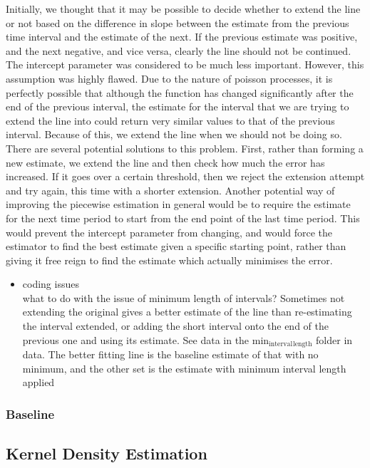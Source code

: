 \documentclass[a4paper,11pt]{article}
\begin{document}
    Initially, we thought that it may be possible to decide whether to
    extend the line or not based on the difference in slope between
    the estimate from the previous time interval and the estimate of
    the next. If the previous estimate was positive, and the next
    negative, and vice versa, clearly the line should not be
    continued. The intercept parameter was considered to be much less
    important. However, this assumption was highly flawed. Due to the
    nature of poisson processes, it is perfectly possible that
    although the function has changed significantly after the end of
    the previous interval, the estimate for the interval that we are
    trying to extend the line into could return very similar values to
    that of the previous interval. Because of this, we extend the line
    when we should not be doing so. There are several potential
    solutions to this problem. First, rather than forming a new
    estimate, we extend the line and then check how much the error has
    increased. If it goes over a certain threshold, then we reject the
    extension attempt and try again, this time with a shorter
    extension. Another potential way of improving the piecewise
    estimation in general would be to require the estimate for the
    next time period to start from the end point of the last time
    period. This would prevent the intercept parameter from changing,
    and would force the estimator to find the best estimate given a
    specific starting point, rather than giving it free reign to find
    the estimate which actually minimises the error.
\begin{itemize}

\item coding issues\\
\label{sec-4-1-3-1}%
what to do with the issue of minimum length of intervals? Sometimes
not extending the original gives a better estimate of the line than
re-estimating the interval extended, or adding the short interval onto
the end of the previous one and using its estimate. See data in the
min$_{\mathrm{interval}}$$_{\mathrm{length}}$ folder in data. The better fitting line is the
baseline estimate of that with no minimum, and the other set is the
estimate with minimum interval length applied
\end{itemize} %
\subsubsection{Baseline}
\label{sec-4-1-4}
\subsection{Kernel Density Estimation}
\label{sec-4-2}
\end{document}
